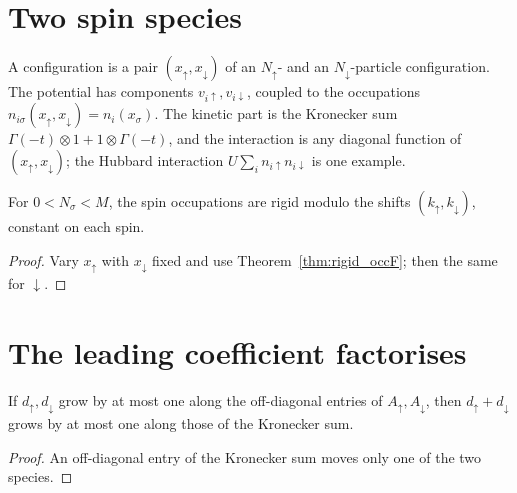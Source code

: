 \section{Two spin species}

\begin{definition}
  \label{def:H0S}
  \leanok
  A configuration is a pair $(x_\uparrow,x_\downarrow)$ of an $N_\uparrow$- and an $N_\downarrow$-particle
  configuration. The potential has components $v_{i\uparrow},v_{i\downarrow}$, coupled to the occupations
  $n_{i\sigma}(x_\uparrow,x_\downarrow)=n_i(x_\sigma)$. The kinetic part is the Kronecker sum
  $\Gamma(-t)\otimes1+1\otimes\Gamma(-t)$, and the interaction is any diagonal function of
  $(x_\uparrow,x_\downarrow)$; the Hubbard interaction $U\sum_in_{i\uparrow}n_{i\downarrow}$ is one example.
\end{definition}

\begin{theorem}
  \label{thm:rigid_occS}
  \leanok
  For $0<N_\sigma<M$, the spin occupations are rigid modulo the shifts $(k_\uparrow,k_\downarrow)$, constant
  on each spin.
\end{theorem}
\begin{proof}
  \leanok
  Vary $x_\uparrow$ with $x_\downarrow$ fixed and use Theorem~\ref{thm:rigid_occF}; then the same for
  $\downarrow$.
\end{proof}

\section{The leading coefficient factorises}

\begin{lemma}
  \label{lem:lip_kronSum}
  \leanok
  If $d_\uparrow,d_\downarrow$ grow by at most one along the off-diagonal entries of $A_\uparrow,A_\downarrow$,
  then $d_\uparrow+d_\downarrow$ grows by at most one along those of the Kronecker sum.
\end{lemma}
\begin{proof}
  \leanok
  An off-diagonal entry of the Kronecker sum moves only one of the two species.
\end{proof}

